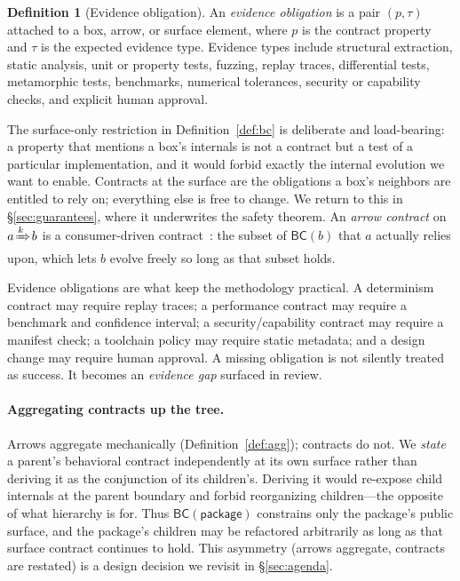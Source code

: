 \documentclass[sigconf,review,anonymous]{acmart}
\theoremstyle{plain}
\theoremstyle{definition}
\newtheorem{definition}[theorem]{Definition}
\begin{document}
\begin{definition}[Evidence obligation]\label{def:evidence}
An \emph{evidence obligation} is a pair $(p,\tau)$ attached to a box, arrow, or
surface element, where $p$ is the contract property and $\tau$ is the expected
evidence type. Evidence types include structural extraction, static analysis,
unit or property tests, fuzzing, replay traces, differential tests,
metamorphic tests, benchmarks, numerical tolerances, security or capability
checks, and explicit human approval.
\end{definition}

The surface-only restriction in Definition~\ref{def:bc} is deliberate and
load-bearing: a property that mentions a box's internals is not a contract but
a test of a particular implementation, and it would forbid exactly the internal
evolution we want to enable. Contracts at the surface are the obligations a
box's neighbors are entitled to rely on; everything else is free to change. We
return to this in \S\ref{sec:guarantees}, where it underwrites the safety
theorem. An \emph{arrow contract} on $a\!\xRightarrow{k}\! b$ is a consumer-driven
contract~\cite{fowler2006cdc}: the subset of $\mathsf{BC}(b)$ that $a$ actually
relies upon, which lets $b$ evolve freely so long as that subset holds.

Evidence obligations are what keep the methodology practical. A determinism
contract may require replay traces; a performance contract may require a
benchmark and confidence interval; a security/capability contract may require a
manifest check; a toolchain policy may require static metadata; and a design
change may require human approval. A missing obligation is not silently treated
as success. It becomes an \emph{evidence gap} surfaced in review.

\paragraph{Aggregating contracts up the tree.}
Arrows aggregate mechanically (Definition~\ref{def:agg}); contracts do not. We
\emph{state} a parent's behavioral contract independently at its own surface
rather than deriving it as the conjunction of its children's. Deriving it would
re-expose child internals at the parent boundary and forbid reorganizing
children---the opposite of what hierarchy is for. Thus $\mathsf{BC}(\textsf{package})$
constrains only the package's public surface, and the package's children may be
refactored arbitrarily as long as that surface contract continues to hold. This
asymmetry (arrows aggregate, contracts are restated) is a design decision we
revisit in \S\ref{sec:agenda}.
\end{document}
